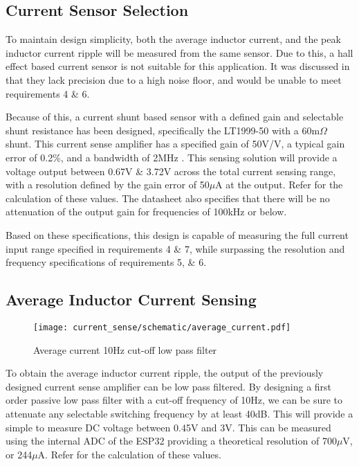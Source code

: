 \subsection{Current Sensor Selection}\label{S:current_sense_selection}

To maintain design simplicity, both the average inductor current, and the peak inductor current ripple will be measured from the same sensor. Due to this, a hall effect based current sensor is not suitable for this application. It was discussed in  that they lack precision due to a high noise floor, and would be unable to meet requirements 4 \& 6. 

Because of this, a current shunt based sensor with a defined gain and selectable shunt resistance has been designed, specifically the LT1999-50 with a 60m$\Omega$ shunt. This current sense amplifier has a specified gain of 50V/V, a typical gain error of 0.2\%, and a bandwidth of 2MHz \cite{LT1999_datasheet}. This sensing solution will provide a voltage output between 0.67V \& 3.72V across the total current sensing range, with a resolution defined by the gain error of 50$\mu$A at the output. Refer  for the calculation of these values. The datasheet also specifies that there will be no attenuation of the output gain for frequencies of 100kHz or below. 

Based on these specifications, this design is capable of measuring the full current input range specified in requirements 4 \& 7, while surpassing the resolution and frequency specifications of requirements 5, \& 6.


\subsection{Average Inductor Current Sensing}\label{S:avg_current_design}

\begin{wrapfigure}{r}{0.3\textwidth}
    \vspace{-33pt}
    \begin{center}
      \texttt{[image: current\_sense/schematic/average\_current.pdf]}
    \end{center}
    \caption{Average current 10Hz cut-off low pass filter}
    \vspace{-22pt}
\end{wrapfigure}

To obtain the average inductor current ripple, the output of the previously designed current sense amplifier can be low pass filtered. By designing a first order passive low pass filter with a cut-off frequency of 10Hz, we can be sure to attenuate any selectable switching frequency by at least 40dB. This will provide a simple to measure DC voltage between 0.45V and 3V. This can be measured using the internal ADC of the ESP32 providing a theoretical resolution of 700$\mu$V, or 244$\mu$A. Refer  for the calculation of these values.


